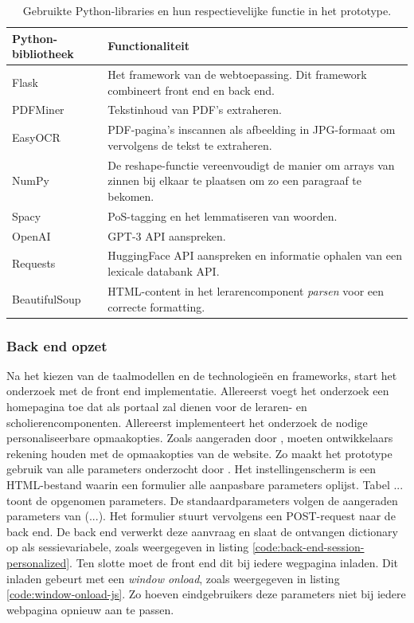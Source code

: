 \begin{center}
	\begin{table}[H]
	\begin{tabular}{ | m{4cm} | m{11cm} | } 
		\hline
		\textbf{Python-bibliotheek} & \textbf{Functionaliteit} \\
		\hline
		Flask					& Het framework van de webtoepassing. Dit framework combineert front end en back end. \\ 
		\hline
		PDFMiner 				& Tekstinhoud van PDF's extraheren. \\ 
		\hline
		EasyOCR					& PDF-pagina's inscannen als afbeelding in JPG-formaat om vervolgens de tekst te extraheren. \\
		\hline
		NumPy 					& De reshape-functie vereenvoudigt de manier om arrays van zinnen bij elkaar te plaatsen om zo een paragraaf te bekomen. \\
		\hline		
		Spacy 					& PoS-tagging en het lemmatiseren van woorden. \\
		\hline
		OpenAI					& GPT-3 API aanspreken. \\
		\hline
		Requests				& HuggingFace API aanspreken en informatie ophalen van een lexicale databank API. \\
		\hline
		BeautifulSoup			& HTML-content in het lerarencomponent \textit{parsen} voor een correcte formatting. \\
		\hline
	\end{tabular}
	\caption{Gebruikte Python-libraries en hun respectievelijke functie in het prototype.}
	\label{table:python-libraries}
	\end{table}
\end{center}

\subsubsection{Back end opzet}

Na het kiezen van de taalmodellen en de technologieën en frameworks, start het onderzoek met de front end implementatie. Allereerst voegt het onderzoek een homepagina toe dat als portaal zal dienen voor de leraren- en scholierencomponenten. Allereerst implementeert het onderzoek de nodige personaliseerbare opmaakopties. Zoals aangeraden door \textcite{Galliussi2020}, moeten ontwikkelaars rekening houden met de opmaakopties van de website. Zo maakt het prototype gebruik van alle parameters onderzocht door \textcite{Rello2013a, Rello2013b}. Het instellingenscherm is een HTML-bestand waarin een formulier alle aanpasbare parameters oplijst. Tabel ... toont de opgenomen parameters. De standaardparameters volgen de aangeraden parameters van (...). Het formulier stuurt vervolgens een POST-request naar de back end. De back end verwerkt deze aanvraag en slaat de ontvangen dictionary op als sessievariabele, zoals weergegeven in listing \ref{code:back-end-session-personalized}. Ten slotte moet de front end dit bij iedere wegpagina inladen. Dit inladen gebeurt met een \textit{window onload}, zoals weergegeven in listing \ref{code:window-onload-js}. Zo hoeven eindgebruikers deze parameters niet bij iedere webpagina opnieuw aan te passen.

